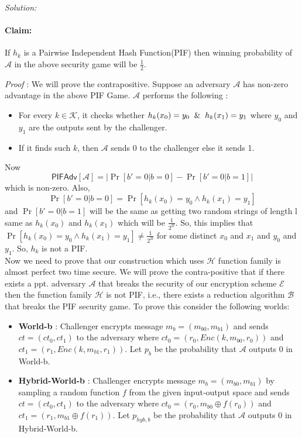 \documentclass[a4paper, 11pt]{article}
\newenvironment{solution}
    {\textit{Solution:}}
    {\clearpage}
\newcommand{\calA}{\mathcal{A}}
\newcommand{\calB}{\mathcal{B}}
\newcommand{\calE}{\mathcal{E}}
\newcommand{\calH}{\mathcal{H}}
\newcommand{\calK}{\mathcal{K}}
\begin{document}
\begin{solution}
\begin{enumerate}[(a)]
        \paragraph{Claim:} If $h_k$ is a Pairwise Independent Hash Function(PIF) then winning probability of $\calA$ in the above security game will be $\frac{1}{2}$.

        \textit{Proof} : We will prove the contrapositive. Suppose an adversary $\calA$ has non-zero advantage in the above PIF Game. $\calA$ performs the following : 
        \begin{itemize}
            
            \item For every $k \in \calK$, it checks whether $h_k(x_0) = y_0 \And h_k(x_1) = y_1$ where $y_0$ and $y_1$ are the outputs sent by the challenger. 
            \item If it finds such $k$, then $\calA$ sends $0$ to the challenger else it sends 1.
        \end{itemize}
        Now 
        $$\mathsf{PIFAdv}[\calA] = \Big| \Pr[b'=0|b=0]-\Pr[b'=0|b=1] \Big| $$ 
        which is non-zero.
        Also,
        $$\Pr[b'=0|b=0] = \Pr[h_k(x_0) = y_0 \land h_k(x_1) = y_1]$$
        and $\Pr[b'=0|b=1]$ will be the same as getting two random strings of length l same as $h_k(x_0)$ and $h_k(x_1)$ which will be $\frac{1}{2^{2l}}$. So, this implies that $\Pr[h_k(x_0) = y_0 \land h_k(x_1) = y_1] \ne \frac{1}{2^{2l}}$ for some distinct $x_0$ and $x_1$ and $y_0$ and $y_1$. So, $h_k$ is not a PIF.\\

        Now we need to prove that our construction which uses $\calH$ function family is almost perfect two time secure. We will prove the contra-positive that if there exists a ppt. adversary $\calA$ that breaks the security of our encryption scheme $\calE$ then the function family $\calH$ is not PIF, i.e., there exists a reduction algorithm $\calB$ that breaks the PIF security game. To prove this consider the following worlds: 
        \begin{itemize}
            \item \textbf{World-b} : Challenger encrypts message $m_b = (m_{b0}, m_{b1})$ and sends $ct = (ct_0, ct_1)$ to the adversary where $ct_0 = (r_0, Enc(k, m_{b0}, r_0))$ and $ct_1 = (r_1, Enc(k, m_{b1}, r_1))$. Let $p_b$ be the probability that $\calA$ outputs 0 in World-b.
            \item \textbf{Hybrid-World-b} : Challenger encrypts message  $m_b = (m_{b0}, m_{b1})$ by sampling a random function $f$ from the given input-output space and sends $ct = (ct_0, ct_1)$ to the adversary where $ct_0 = (r_0, m_{b0} \oplus f(r_0))$ and $ct_1 = (r_1, m_{b1} \oplus f(r_1))$. Let $p_{hyb,b}$ be the probability that $\calA$ outputs 0 in Hybrid-World-b.
        \end{itemize}


\end{enumerate}
\end{solution}
\end{document}

